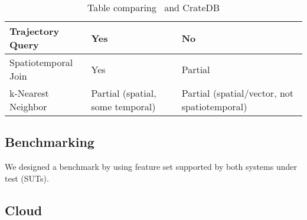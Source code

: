 \begin{table}[h]
\begin{tabular}{|P{3.3cm}|P{6cm}|P{4cm}|}
		\hline
		Trajectory Query                  & Yes                                                                 & No                                                     \\
		\hline
		Spatiotemporal Join               & Yes                                                                 & Partial                                                \\
		\hline
		k-Nearest Neighbor                & Partial (spatial, some temporal)                                    & Partial (spatial/vector, not spatiotemporal)           \\
		\hline
	\end{tabular}
	\caption{Table comparing \mobilitydbc~and CrateDB}
	\label{tab:mobilitydb_vs_cratedb}
\end{table}

\subsection{Benchmarking}


We designed a benchmark by using feature set supported by both systems under test (SUTs).

\subsection{Cloud}


